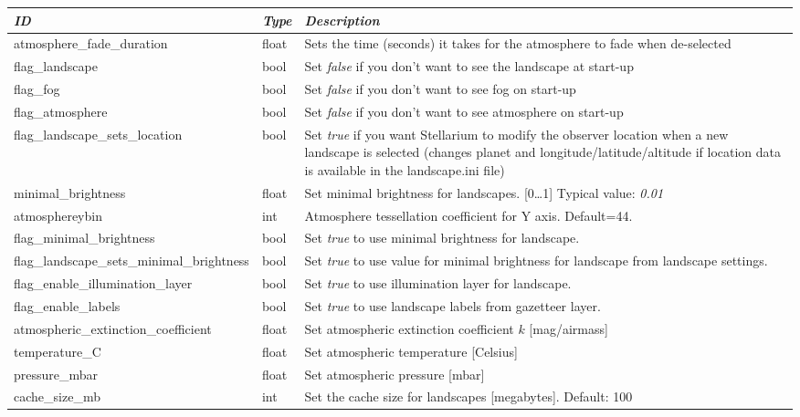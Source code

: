 \begin{longtable}{l|l|p{68mm}}\toprule
\emph{ID}                            & \emph{Type} & \emph{Description}\\\midrule
atmosphere\_fade\_duration                 & float & Sets the time (seconds) it takes for the atmosphere to fade when de-selected\\%
flag\_landscape                            & bool  & Set \emph{false} if you don't want to see the landscape at start-up\\%
flag\_fog                                  & bool  & Set \emph{false} if you don't want to see fog on start-up\\%
flag\_atmosphere                           & bool  & Set \emph{false} if you don't want to see atmosphere on start-up\\%
flag\_landscape\_sets\_location            & bool  & Set \emph{true} if you want Stellarium to modify the observer location 
                                                     when a new landscape is selected (changes planet and longitude/latitude/altitude 
                                                     if location data is available in the landscape.ini file)\\%
minimal\_brightness                        & float & Set minimal brightness for landscapes. [0\ldots1] Typical value: \emph{0.01}\\%
atmosphereybin		                   & int   & Atmosphere tessellation coefficient for Y axis. Default=44.\\%
flag\_minimal\_brightness                  & bool  & Set \emph{true} to use minimal brightness for landscape.\\%
flag\_landscape\_sets\_minimal\_brightness & bool  & Set \emph{true} to use value for minimal brightness for landscape from landscape settings.\\%
flag\_enable\_illumination\_layer          & bool  & Set \emph{true} to use illumination layer for landscape.\\%
flag\_enable\_labels                       & bool  & Set \emph{true} to use landscape labels from gazetteer layer.\\%
atmospheric\_extinction\_coefficient       & float & Set atmospheric extinction coefficient $k$ [mag/airmass]\\%
temperature\_C                             & float & Set atmospheric temperature [Celsius]\\%
pressure\_mbar                             & float & Set atmospheric pressure [mbar]\\%
cache\_size\_mb                            & int   & Set the cache size for landscapes [megabytes]. Default: 100\\\bottomrule
\end{longtable}

